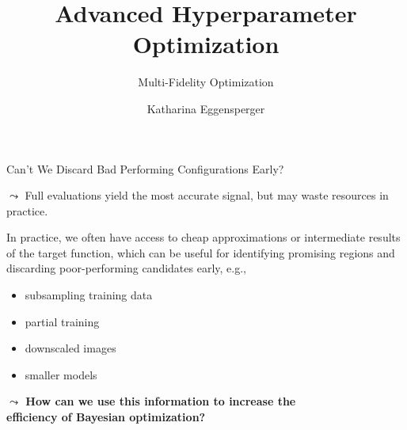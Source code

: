 \documentclass[main]{subfiles}
\title[Advanced Hyperparameter Optimization]{Advanced Hyperparameter Optimization}
\subtitle{Multi-Fidelity Optimization}
\author[Katharina Eggensperger]{Katharina Eggensperger}
\date{}
\begin{document}
	
	\maketitle
	

\begin{frame}[c]{Can't We Discard Bad Performing Configurations Early?}

$\leadsto$ Full evaluations yield the most accurate signal, but may waste resources in practice.

\vspace{0.5cm}

In practice, we often have access to cheap approximations or intermediate results of the target function, which can be useful for identifying promising regions and discarding poor-performing candidates early, e.g.,
\begin{itemize}
    \item subsampling training data
    \item partial training
    \item downscaled images
    \item smaller models
\end{itemize}

\vspace{0.5cm}
\textbf{$\leadsto$ How can we use this information to increase the \\ efficiency of Bayesian optimization?} \\

\end{frame}
\end{document}
